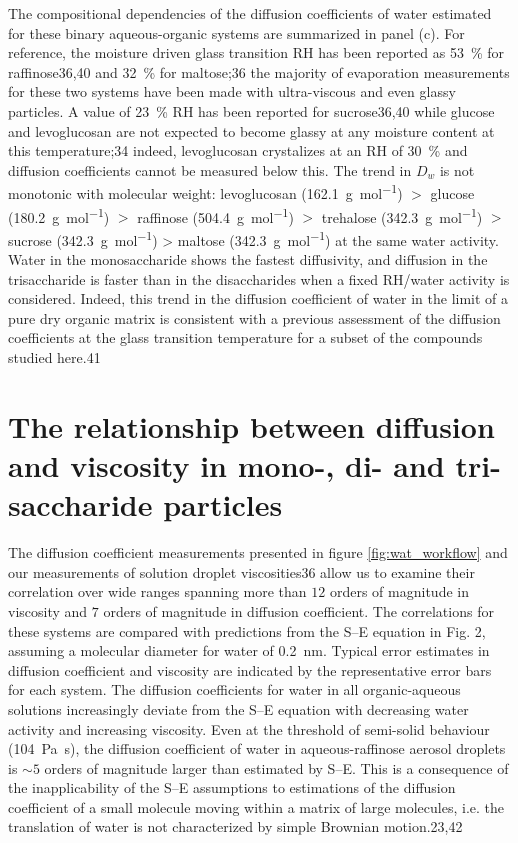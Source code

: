 The compositional dependencies of the diffusion coefficients of water estimated for these binary aqueous-organic systems are summarized in panel (c). For reference, the moisture driven glass transition RH has been reported as \SI{53}{\percent} for raffinose36,40 and \SI{32}{\percent} for maltose;36 the majority of evaporation measurements for these two systems have been made with ultra-viscous and even glassy particles. A value of \SI{23}{\percent} RH has been reported for sucrose36,40 while glucose and levoglucosan are not expected to become glassy at any moisture content at this temperature;34 indeed, levoglucosan crystalizes at an RH of \SI{30}{\percent} and diffusion coefficients cannot be measured below this. The trend in $D_{w}$ is not monotonic with molecular weight: levoglucosan (\SI{162.1}{\gram\per\mol}) $>$ glucose (\SI{180.2}{\gram\per\mol}) $>$ raffinose (\SI{504.4}{\gram\per\mole}) $>$ trehalose (\SI{342.3}{\gram\per\mole}) $>$ sucrose (\SI{342.3}{\gram\per\mol}) > maltose (\SI{342.3}{\gram\per\mole}) at the same water activity. Water in the monosaccharide shows the fastest diffusivity, and diffusion in the trisaccharide is faster than in the disaccharides when a fixed RH/water activity is considered. Indeed, this trend in the diffusion coefficient of water in the limit of a pure dry organic matrix is consistent with a previous assessment of the diffusion coefficients at the glass transition temperature for a subset of the compounds studied here.41

\section{The relationship between diffusion and viscosity in mono-, di- and tri-saccharide particles}\label{sec:wat_d_eta}

The diffusion coefficient measurements presented in figure \ref{fig:wat_workflow} and our measurements of solution droplet viscosities36 allow us to examine their correlation over wide ranges spanning more than $12$ orders of magnitude in viscosity and $7$ orders of magnitude in diffusion coefficient. The correlations for these systems are compared with predictions from the S–E equation in Fig. 2, assuming a molecular diameter for water of \SI{0.2}{\nano\meter}. Typical error estimates in diffusion coefficient and viscosity are indicated by the representative error bars for each system. The diffusion coefficients for water in all organic-aqueous solutions increasingly deviate from the S–E equation with decreasing water activity and increasing viscosity. Even at the threshold of semi-solid behaviour (\SI{104}{\pascal\second}), the diffusion coefficient of water in aqueous-raffinose aerosol droplets is $\sim 5$ orders of magnitude larger than estimated by S–E. This is a consequence of the inapplicability of the S–E assumptions to estimations of the diffusion coefficient of a small molecule moving within a matrix of large molecules, i.e. the translation of water is not characterized by simple Brownian motion.23,42

